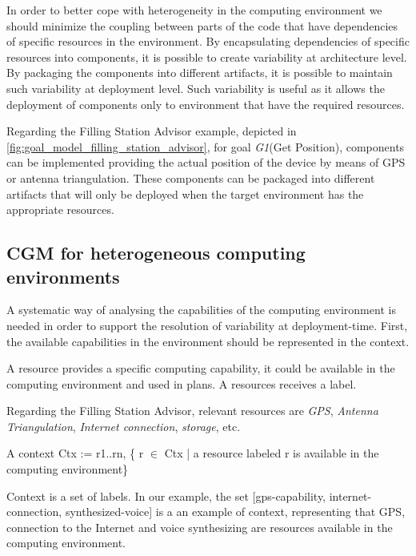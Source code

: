 In order to better cope with heterogeneity in the computing environment we should minimize the coupling between parts of the code that have dependencies of specific resources in the environment.
By encapsulating dependencies of specific resources into components, it is possible to create variability at architecture level. By packaging the components into different artifacts, it is possible to maintain such variability at deployment level. Such variability is useful as it allows the deployment of components only to environment that have the required resources.

Regarding the Filling Station Advisor example, depicted in \ref{fig:goal_model_filling_station_advisor}, for goal \emph{G1}(Get Position), components can be implemented providing the actual position of the device by means of GPS or antenna triangulation. These components can be packaged into different artifacts that will only be deployed when the target environment has the appropriate resources.

\subsection{CGM for heterogeneous computing environments}
\label{context}

A systematic way of analysing the capabilities of the computing environment is needed in order to support the resolution of variability at deployment-time. First, the available capabilities in the environment should be represented in the context.

\begin{defn}[Resource]

  A resource provides a specific computing capability, it could be available in the computing environment and used in plans. A resources receives a label.

\end{defn}

Regarding the Filling Station Advisor, relevant resources are \emph{GPS}, \emph{Antenna Triangulation}, \emph{Internet connection}, \emph{storage}, etc.

\begin{defn}[Context]

  A context Ctx := r1..rn, \{ r $\in$ Ctx | a resource labeled r is available in the computing environment\}
\end{defn}

Context is a set of labels. In our example, the set [gps-capability,
internet-connection, synthesized-voice] is a an example of context, representing that GPS, connection to the Internet and voice synthesizing are resources available in the computing environment.

